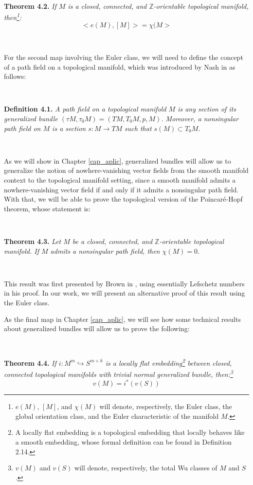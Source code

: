 \documentclass[12pt,oneside]{book}
\newcommand{\Z}{\mathbb{Z}}
\begin{document}
    \

        \textbf{Theorem 4.2. }\textit{If $M$ is a closed, connected, and $\Z$-orientable topological 
        manifold, then\footnote{$e(M)$, $[M]$, and $\chi(M)$ will denote, respectively, the Euler class, 
        the global orientation class, and the Euler characteristic of the manifold $M$.}:
        $$ <e(M),[M]>=\chi(M> $$}

    \

    For the second map involving the Euler class, we will need to define the concept of a path field on 
    a topological manifold, which was introduced by Nash in \cite{nash} as follows:
    
    \

        \textbf{Definition 4.1. }\textit{A path field on a topological manifold $M$ is any section of its 
        generalized bundle $(\tau M,\tau_{0}M)=(TM,T_{0}M,p,M)$. Moreover, a nonsingular path field on $M$ 
        is a section $s:M\to TM$ such that $s(M)\subset T_{0}M$.}

    \

    As we will show in Chapter \ref{cap_aplic}, generalized bundles will allow us to generalize the 
    notion of nowhere-vanishing vector fields from the smooth manifold context to the topological 
    manifold setting, since a smooth manifold admits a nowhere-vanishing vector field if and only if it 
    admits a nonsingular path field. With that, we will be able to prove the topological version of the 
    Poincaré-Hopf theorem, whose statement is:

    \

        \textbf{Theorem 4.3. }\textit{Let $M$ be a closed, connected, and $\Z$-orientable topological 
        manifold. If $M$ admits a nonsingular path field, then $\chi(M)=0$.}

    \

    This result was first presented by Brown in \cite{brown}, using essentially Lefschetz numbers in his 
    proof. In our work, we will present an alternative proof of this result using the Euler class.

    As the final map in Chapter \ref{cap_aplic}, we will see how some technical results about generalized 
    bundles will allow us to prove the following:

    \
    
        \textbf{Theorem 4.4. }\textit{If $i:M^{m}\hookrightarrow S^{m+k}$ is a locally flat 
        embedding\footnote{A locally flat embedding is a topological embedding that locally behaves like a 
        smooth embedding, whose formal definition can be found in Definition 2.14.} between closed, 
        connected topological manifolds with trivial normal generalized bundle, then:\footnote{$v(M)$ and 
        $v(S)$ will denote, respectively, the total Wu classes of $M$ and $S$.}
        $$v(M)=i^{*}(v(S))$$}
\end{document}
